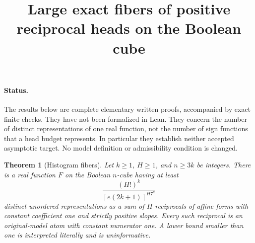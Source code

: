 \documentclass[11pt]{article}
\newtheorem{theorem}{Theorem}
\begin{document}
\title{Large exact fibers of positive reciprocal heads on the Boolean cube}
\author{}\date{}\maketitle

\paragraph{Status.}
The results below are complete elementary written proofs, accompanied by
exact finite checks. They have not been formalized in Lean. They concern
the number of distinct representations of one real function, not the
number of sign functions that a head budget represents. In particular
they establish neither accepted asymptotic target. No model definition
or admissibility condition is changed.

\begin{theorem}[Histogram fibers]\label{thm:fibers}
Let $k\geq1$, $H\geq1$, and $n\geq3k$ be integers. There is a real
function $F$ on the Boolean $n$-cube having at least
\[
 \frac{(H!)^k}{[e(2k+1)]^{H7^k}}
\]
distinct unordered representations as a sum of $H$ reciprocals of
affine forms with constant coefficient one and strictly positive slopes.
Every such reciprocal is an original-model atom with constant numerator
one. A lower bound smaller than one is interpreted literally and is
uninformative.
\end{theorem}
\end{document}
